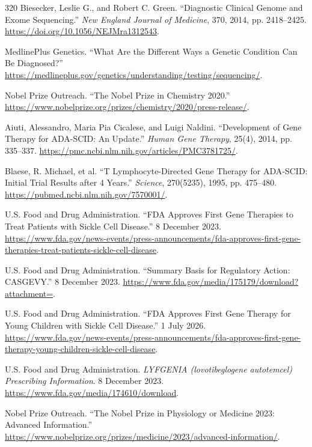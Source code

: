 \documentclass[12pt,oneside]{book}
\begin{document}
\begin{thebibliography}{320}
Biesecker, Leslie G., and Robert C. Green. ``Diagnostic Clinical Genome and
Exome Sequencing.'' \emph{New England Journal of Medicine}, 370, 2014,
pp. 2418--2425. \url{https://doi.org/10.1056/NEJMra1312543}.

MedlinePlus Genetics. ``What Are the Different Ways a Genetic Condition Can
Be Diagnosed?'' \url{https://medlineplus.gov/genetics/understanding/testing/sequencing/}.

Nobel Prize Outreach. ``The Nobel Prize in Chemistry 2020.''
\url{https://www.nobelprize.org/prizes/chemistry/2020/press-release/}.

Aiuti, Alessandro, Maria Pia Cicalese, and Luigi Naldini. ``Development of
Gene Therapy for ADA-SCID: An Update.'' \emph{Human Gene Therapy}, 25(4),
2014, pp. 335--337. \url{https://pmc.ncbi.nlm.nih.gov/articles/PMC3781725/}.

Blaese, R. Michael, et al. ``T Lymphocyte-Directed Gene Therapy for ADA-SCID:
Initial Trial Results after 4 Years.'' \emph{Science}, 270(5235), 1995,
pp. 475--480. \url{https://pubmed.ncbi.nlm.nih.gov/7570001/}.

U.S. Food and Drug Administration. ``FDA Approves First Gene Therapies to
Treat Patients with Sickle Cell Disease.'' 8 December 2023.
\url{https://www.fda.gov/news-events/press-announcements/fda-approves-first-gene-therapies-treat-patients-sickle-cell-disease}.

U.S. Food and Drug Administration. ``Summary Basis for Regulatory Action:
CASGEVY.'' 8 December 2023.
\url{https://www.fda.gov/media/175179/download?attachment=}.

U.S. Food and Drug Administration. ``FDA Approves First Gene Therapy for
Young Children with Sickle Cell Disease.'' 1 July 2026.
\url{https://www.fda.gov/news-events/press-announcements/fda-approves-first-gene-therapy-young-children-sickle-cell-disease}.

U.S. Food and Drug Administration. \emph{LYFGENIA (lovotibeglogene
autotemcel) Prescribing Information}. 8 December 2023.
\url{https://www.fda.gov/media/174610/download}.

Nobel Prize Outreach. ``The Nobel Prize in Physiology or Medicine 2023:
Advanced Information.'' \url{https://www.nobelprize.org/prizes/medicine/2023/advanced-information/}.


\end{thebibliography}
\end{document}
